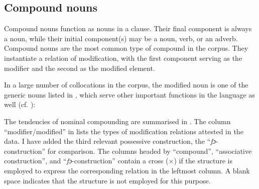 \subsection{Compound nouns}\label{sec:4.4.2}

Compound nouns function as nouns in a clause. Their final component is always a noun, while their initial component(s) may be a noun, verb, or an adverb. Compound nouns are the most common type of compound in the corpus. They instantiate a relation of modification, with the first component serving as the modifier and the second as the modified element. 


In a large number of collocations in the corpus, the modified noun is one of the generic nouns listed in , which serve other important functions in the language as well (cf. \citealt[252]{Faraclas1996}):


The tendencies of nominal compounding are summarised in . The column “modifier/modified” in  lists the types of modification relations attested in the data. I have added the third relevant possessive construction, the “\textit{fɔ}{}-construction” for comparison. The columns headed by “compound”, “associative construction”, and “\textit{fɔ}{}-construction” contain a cross ($\times$) if the structure is employed to express the corresponding relation in the leftmost column. A blank space indicates that the structure is not employed for this purpose. 

